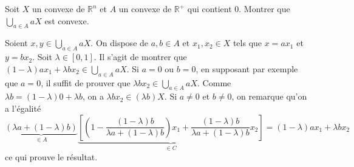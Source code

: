 \documentclass{fancybook}
\begin{document}
\begin{exercice}
Soit $X$ un convexe de $\mathbb R^n$ et $A$ un convexe de $\mathbb R^+$ qui contient $0$. \newline
Montrer que $\bigcup_{a\in A}aX$ est convexe.\newline
\end{exercice}
Soient $x,y\in\bigcup_{a\in A}aX $. On dispose de $a,b\in A$ et $x_1,x_2\in X$ tels que $x=ax_1$ et $y=bx_2$. Soit $\lambda \in [0,1]$. \newline
Il s'agit de montrer que $(1-\lambda)a x_1 + \lambda b x_2\in \bigcup_{a\in A}aX$.\newline
\newline
Si $a=0$ ou $b=0$, en supposant par exemple que $a=0$, il suffit de prouver que $\lambda bx_2 \in \bigcup_{a\in A}aX$. Comme $\lambda b = (1-\lambda)0 +\lambda b$, on a $\lambda bx_2\in (\lambda b) X$.\newline \newline
Si $a\neq 0$ et $b\neq 0$, on remarque qu'on a l'égalité
$$ \underbrace{(\lambda a + (1-\lambda)b)}_{\in A} \underbrace{\left[ \left( 1-\dfrac{(1-\lambda)b }{\lambda a +(1-\lambda)b }\right)x_1 + \dfrac{(1-\lambda)b }{\lambda a +(1-\lambda)b }x_2 \right]}_{\in C}=(1-\lambda)a x_1 + \lambda b x_2$$
ce qui prouve le résultat.
\end{document}

